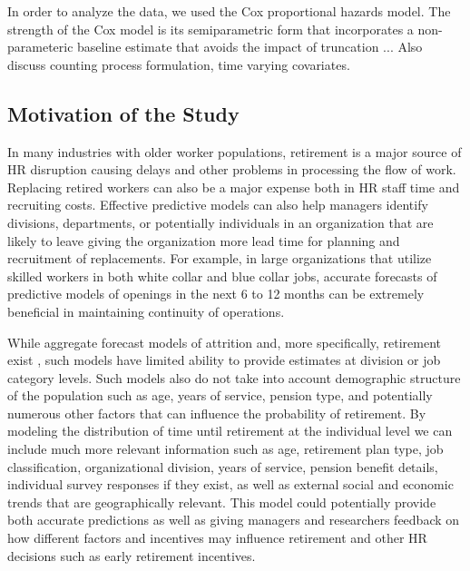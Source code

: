 \documentclass[12pt,letterpaper]{article}
\begin{document}
In order to analyze the data, we used the Cox proportional hazards model.  The strength of the Cox model is its semiparametric form that incorporates a non-parameteric baseline estimate that avoids the impact of truncation ... Also discuss counting process formulation, time varying covariates.


\subsection{Motivation of the Study}


In many industries with older worker populations, retirement is a major source of HR disruption causing delays and other problems in processing the flow of work.  Replacing retired workers can also be a major expense both in HR staff time and recruiting costs.  Effective predictive models can also help managers identify divisions, departments, or potentially individuals in an organization that are likely to leave giving the organization more lead time for planning and recruitment of replacements.  For example, in large organizations that utilize skilled workers in both white collar and blue collar jobs, accurate forecasts of predictive models of openings in the next 6 to 12 months can be extremely beneficial in maintaining continuity of operations.

While aggregate forecast models of attrition and, more specifically, retirement exist \citep{zhu2015}, such models have limited ability to provide estimates at division or job category levels.  Such models also do not take into account demographic structure of the population such as age, years of service, pension type, and potentially numerous other factors that can influence the probability of retirement.  By modeling the distribution of time until retirement at the individual level we can include much more relevant information such as age, retirement plan type, job classification, organizational division, years of service, pension benefit details, individual survey responses if they exist, as well as external social and economic trends that are geographically relevant.   This model could potentially provide both accurate predictions as well as giving managers and researchers feedback on how different factors and incentives may influence retirement and other HR decisions such as early retirement incentives.



\end{document}
